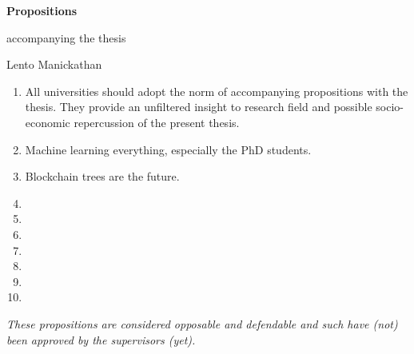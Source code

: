 \thispagestyle{empty}

\begin{center}
	
	\begingroup
	\Large{\textbf{Propositions}}
	\endgroup
	\hfill
	
	
	accompanying the thesis
	
	\vspace{4mm}
	
	\begingroup
	\Large{\textbf{\myTitle}}
	\endgroup
	
	
	Lento Manickathan

\end{center}

\vspace{8mm}	
	
\begin{enumerate}
	\item All universities should adopt the norm of accompanying propositions with the thesis. They provide an unfiltered insight to research field and possible socio-economic repercussion of the present thesis. 
	
	\item Machine learning everything, especially the PhD students.
		
	\item Blockchain trees are the future.
	\item 
	\item 		
	\item 
	\item 
	\item 		
	\item 
	\item 			
\end{enumerate}	

\vfill

\vfill

\begin{center}
	\footnotesize{\textit{These propositions are considered opposable and defendable and such have (not) been approved by the supervisors (yet).}}
\end{center}

